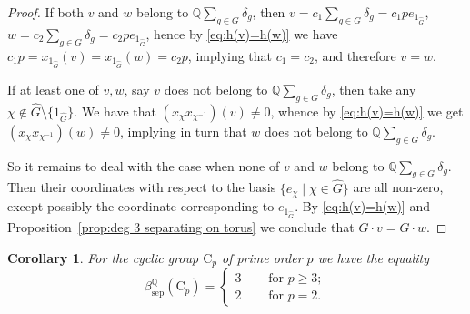 \documentclass[12pt, oneside]{amsart}
\newtheorem{corollary}[theorem]{\bf Corollary}
\def\QQ{\mathbb{Q}}
\def\sepbeta{\beta_{\mathrm{sep}}}
\begin{document}
\begin{proof}
If both $v$ and $w$ belong to  $\QQ\sum_{g\in G}\delta_g$, then 
$v=c_1\sum_{g\in G}\delta_g=c_1pe_{1_{\widehat G}}$, $w=c_2\sum_{g\in G}\delta_g=c_2pe_{1_{\widehat G}}$, 
hence by \eqref{eq:h(v)=h(w)} we have $c_1p=x_{1_{\widehat G}}(v)=x_{1_{\widehat G}}(w)=c_2p$,  
implying  that $c_1=c_2$, and therefore $v=w$. 
 
If at least one of $v,w$, say $v$ does not belong to  $\QQ\sum_{g\in G}\delta_g$, then take any $\chi\notin\widehat G\setminus \{1_{\widehat G}\}$. 
We have that $(x_\chi x_{\chi^{-1}})(v) \neq 0$, whence  by \eqref{eq:h(v)=h(w)} we get 
$(x_\chi x_{\chi^{-1}})(w)\neq 0$, implying in turn that 
$w$ does not belong to  $\QQ\sum_{g\in G}\delta_g$. 

So it remains to deal with the case when  
none of $v$ and $w$ belong to $\QQ\sum_{g\in G}\delta_g$. Then their coordinates 
with respect to the basis $\{e_\chi\mid \chi\in \widehat G\}$ are all non-zero, except possibly the coordinate 
corresponding to $e_{1_{\widehat G}}$. By \eqref{eq:h(v)=h(w)} and 
Proposition~\ref{prop:deg 3 separating on torus} we conclude that $G\cdot v=G\cdot w$. 
\end{proof} 


\begin{corollary}\label{cor:all rational reps} 
For the cyclic group $\mathrm{C}_p$ of prime order $p$ we have the equality 
\[\sepbeta^\QQ(\mathrm{C}_p)=\begin{cases} 3 &\quad \text{ for  }p\ge3; \\
2 &\quad \text{ for }p=2.\end{cases}\]  
\end{corollary} 
\end{document}
